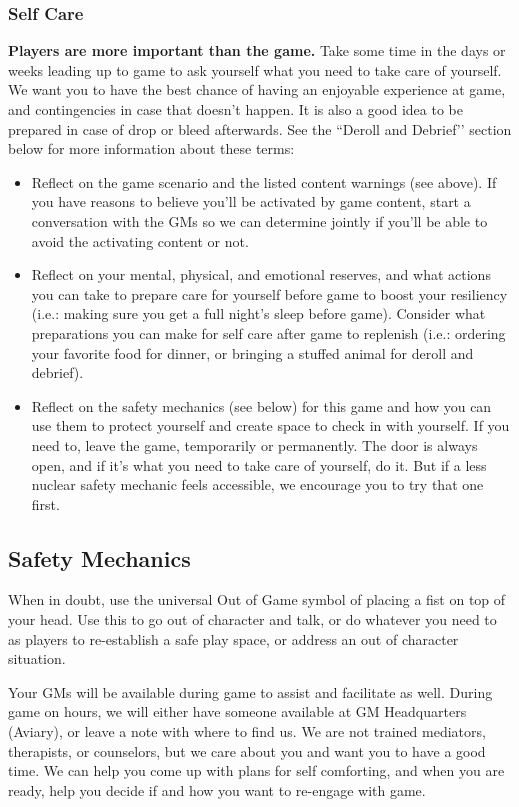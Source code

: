 \documentclass[sheet]{GL2020}
\begin{document}
\subsubsection{Self Care}
\textbf{Players are more important than the game.} Take some time in the days or weeks leading up to game to ask yourself what you need to take care of yourself. We want you to have the best chance of having an enjoyable experience at game, and contingencies in case that doesn’t happen. It is also a good idea to be prepared in case of drop or bleed afterwards. See the ``Deroll and Debrief’’ section below for more information about these terms:
\begin{itemize}
  \item Reflect on the game scenario and the listed content warnings (see above). If you have reasons to believe you’ll be activated by game content, start a conversation with the GMs so we can determine jointly if you’ll be able to avoid the activating content or not.
  \item Reflect on your mental, physical, and emotional reserves, and what actions you can take to prepare care for yourself before game to boost your resiliency (i.e.: making sure you get a full night's sleep before game). Consider what preparations you can make for self care after game to replenish (i.e.: ordering your favorite food for dinner, or bringing a stuffed animal for deroll and debrief). 
  \item Reflect on the safety mechanics (see below) for this game and how you can use them to protect yourself and create space to check in with yourself. If you need to, leave the game, temporarily or permanently. The door is always open, and if it’s what you need to take care of yourself, do it. But if a less nuclear safety mechanic feels accessible, we encourage you to try that one first.
\end{itemize}

\subsection{Safety Mechanics}
When in doubt, use the universal Out of Game symbol of placing a fist on top of your head. Use this to go out of character and talk, or do whatever you need to as players to re-establish a safe play space, or address an out of character situation. 

Your GMs will be available during game to assist and facilitate as well. During game on hours, we will either have someone available at GM Headquarters (Aviary), or leave a note with where to find us. We are not trained mediators, therapists, or counselors, but we care about you and want you to have a good time. We can help you come up with plans for self comforting, and when you are ready, help you decide if and how you want to re-engage with game.
\end{document}
